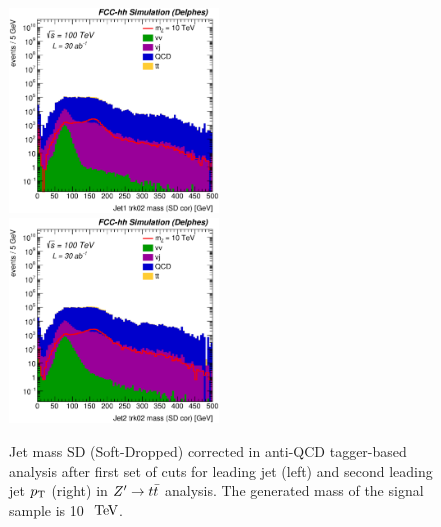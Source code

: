 \documentclass{cernrep}
\begin{document}
\begin{figure}[!htb]\centering
\includegraphics[width=0.495\textwidth]{Fig/Zptt/Jet1_trk02_SD_Cor_m_sel3_nostack_log.eps}
\includegraphics[width=0.495\textwidth]{Fig/Zptt/Jet2_trk02_SD_Cor_m_sel3_nostack_log.eps}
\caption{Jet mass SD (Soft-Dropped) corrected in anti-QCD tagger-based analysis after first set of cuts for leading jet (left) and second leading jet $p\sb{\scriptstyle\mathrm{T}}$ (right) in $Z^{\prime} \rightarrow t\bar{t}$ analysis. The generated mass of the signal sample is 10 $\TeV$.}
\label{fig:RSGww_sel1_tagger}
\end{figure}
\end{document}
